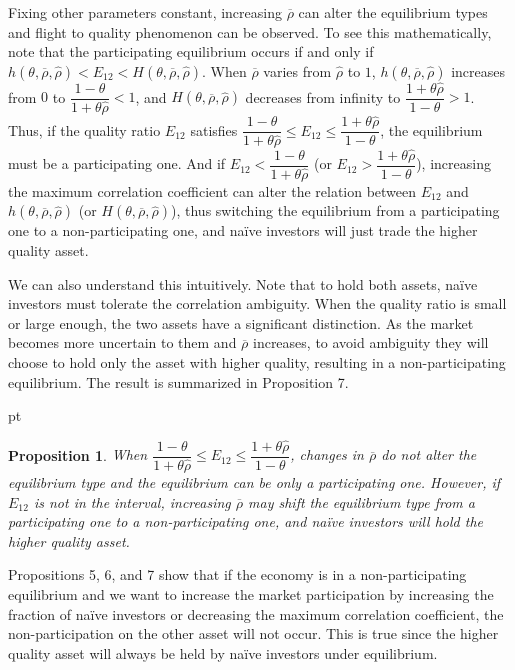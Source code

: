 \documentclass[10pt]{article}
\newtheorem{prop}{Proposition}
\begin{document}
Fixing other parameters constant, increasing $ \overline{\rho} $ can alter the equilibrium types and flight to quality phenomenon can be observed. To see this mathematically, note that the participating equilibrium occurs if and only if $ h (\theta, \overline{\rho}, {\hat \rho}) < E_{12} < H (\theta, \overline{\rho}, {\hat \rho})$. When $ \overline{\rho} $ varies from $ \hat{\rho} $ to $1$, $ h (\theta, \overline{\rho}, {\hat \rho}) $ increases from $0$ to $ \dfrac{1 - \theta}{1 + \theta \hat{\rho}} < 1 $, and $ H (\theta, \overline{\rho}, {\hat \rho}) $ decreases from infinity to $ \dfrac{1 + \theta \hat{\rho}}{1 - \theta} > 1 $. Thus, if the quality ratio $ E_{12} $ satisfies $ \dfrac{1 - \theta}{1 + \theta\hat{\rho}} \leqslant E_{12} \leqslant \dfrac{1 + \theta\hat{\rho}}{1 - \theta} $, the equilibrium must be a participating one. And if $ E_{12} < \dfrac{1 - \theta}{1 + \theta \hat{\rho}} $ (or $ E_{12} > \dfrac{1 + \theta \hat{\rho}}{1 - \theta} $), increasing the maximum correlation coefficient can alter the relation between $ E_{12} $ and $ h (\theta, \overline{\rho}, {\hat \rho}) $ (or $ H (\theta, \overline{\rho}, {\hat \rho}) $), thus switching the equilibrium from a participating one to a non-participating one, and na\"ive investors will just trade the higher quality asset. 

We can also understand this intuitively. Note that to hold both assets, na\"ive investors must tolerate the correlation ambiguity. When the quality ratio is small or large enough, the two assets have a significant distinction. As the market becomes more uncertain to them and $ \overline{\rho} $ increases, to avoid ambiguity they will choose to hold only the asset with higher quality, resulting in a non-participating equilibrium. The result is summarized in Proposition 7. 

 pt

\begin{prop}
When $ \dfrac{1 - \theta}{1 + \theta \hat{\rho}} \leqslant E_{12} \leqslant \dfrac{1 + \theta \hat{\rho}}{1 - \theta} $, changes in $ \overline{\rho} $ do not alter the equilibrium type and the equilibrium can be only a participating one. However, if $ E_{1 2} $ is not in the interval, increasing $ \overline{\rho} $ may shift the equilibrium type from a participating one to a non-participating one, and na\"ive investors will hold the higher quality asset. 
\end{prop}

Propositions 5, 6, and 7 show that if the economy is in a non-participating equilibrium and we want to increase the market participation by increasing the fraction of na\"ive investors or decreasing the maximum correlation coefficient, the non-participation on the other asset will not occur. This is true since the higher quality asset will always be held by na\"ive investors under equilibrium. 
\end{document}
